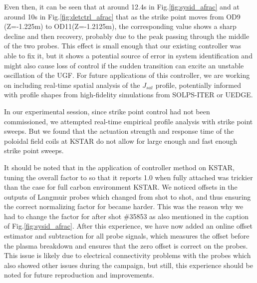 Even then, it can be seen that at around 12.4s in Fig.\ref{fig:sysid_afrac} and at around 10s in Fig.\ref{fig:detctrl_afrac} that as the strike point moves from OD9 (Z=-1.225m) to OD11(Z=-1.2125m), the corresponding \Afrac value shows a sharp decline and then recovery, probably due to the peak passing through the middle of the two probes.
This effect is small enough that our existing controller was able to fix it, but it shows a potential source of error in system identification and might also cause loss of control if the sudden transition can excite an unstable oscillation of the \ac{UGF}.
For future applications of this controller, we are working on including real-time spatial analysis of the $J_{sat}$ profile, potentially informed with profile shapes from high-fidelity simulations from SOLPS-ITER or UEDGE.

In our experimental session, since strike point control had not been commissioned, we attempted real-time empirical profile analysis with strike point sweeps.
But we found that the actuation strength and response time of the poloidal field coils at KSTAR do not allow for large enough and fast enough strike point sweeps.

It should be noted that in the application of \Afrac controller method on KSTAR, tuning the overall factor to \Afrac so that it reports 1.0 when fully attached was trickier than the case for full carbon environment KSTAR\cite{Eldon_2022_PPCF}.
We noticed offsets in the outputs of Langmuir probes which changed from shot to shot, and thus ensuring the correct normalizing factor for \Afrac became harder.
This was the reason why we had to change the factor for \Afrac after shot \#35853 as also mentioned in the caption of Fig.\ref{fig:sysid_afrac}.
After this experience, we have now added an online offset estimator and subtraction for all probe signals, which measures the offset before the plasma breakdown and ensures that the zero offset is correct on the probes.
This issue is likely due to electrical connectivity problems with the probes which also showed other issues during the campaign, but still, this experience should be noted for future reproduction and improvements.

